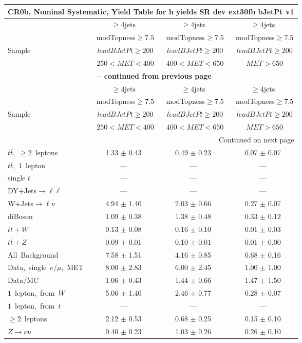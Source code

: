 \documentclass{article}
\begin{document}
\begin{longtable}{|l|c|c|c|} 
 
\multicolumn{4}{c}{ CR0b, Nominal Systematic, Yield Table for h yields SR dev ext30fb bJetPt v1 }\\* \hline 
  & $\ge4$jets  & $\ge4$jets  & $\ge4$jets \\* 
  & ~modTopness$\ge7.5$  & ~modTopness$\ge7.5$  & ~modTopness$\ge7.5$ \\* 
Sample  & ~$leadBJetPt\ge200$  & ~$leadBJetPt\ge200$  & ~$leadBJetPt\ge200$ \\* 
  & ~$250<MET<400$  & ~$400<MET<650$  & ~$MET>650$ \\* 
\hline \hline 
\endfirsthead 
 
\multicolumn{4}{c}{{\bfseries \tablename\ \thetable{} -- continued from previous page}}\\* \hline 
  & $\ge4$jets  & $\ge4$jets  & $\ge4$jets \\* 
  & ~modTopness$\ge7.5$  & ~modTopness$\ge7.5$  & ~modTopness$\ge7.5$ \\* 
Sample  & ~$leadBJetPt\ge200$  & ~$leadBJetPt\ge200$  & ~$leadBJetPt\ge200$ \\* 
  & ~$250<MET<400$  & ~$400<MET<650$  & ~$MET>650$ \\* 
\hline \hline 
\endhead 
 
\multicolumn{4}{|r|}{{Continued on next page}}\\* \hline 
\endfoot 
 
 
\endlastfoot 
 
$t\bar{t}$,~$\ge2$~leptons & 1.33 $\pm$ 0.43  & 0.49 $\pm$ 0.23  & 0.07 $\pm$ 0.07 \\* 
$t\bar{t}$,~$1$~lepton & ---  & ---  & --- \\* 
single $t$  & ---  & ---  & --- \\* 
DY+Jets$\rightarrow\ell\ell$  & ---  & ---  & --- \\* 
W+Jets$\rightarrow\ell\nu$  & 4.94 $\pm$ 1.40  & 2.03 $\pm$ 0.66  & 0.27 $\pm$ 0.07 \\* 
diBoson  & 1.09 $\pm$ 0.38  & 1.38 $\pm$ 0.48  & 0.33 $\pm$ 0.12 \\* 
$t\bar{t}+W$  & 0.13 $\pm$ 0.08  & 0.16 $\pm$ 0.10  & 0.01 $\pm$ 0.03 \\* 
$t\bar{t}+Z$  & 0.09 $\pm$ 0.01  & 0.10 $\pm$ 0.01  & 0.01 $\pm$ 0.00 \\* 
\hline \hline 
All~Background  & 7.58 $\pm$ 1.51  & 4.16 $\pm$ 0.85  & 0.68 $\pm$ 0.16 \\* 
Data,~single~$e/\mu$,~MET  & 8.00 $\pm$ 2.83  & 6.00 $\pm$ 2.45  & 1.00 $\pm$ 1.00 \\* 
Data/MC  & 1.06 $\pm$ 0.43  & 1.44 $\pm$ 0.66  & 1.47 $\pm$ 1.50 \\* 
\hline \hline 
$1$~lepton,~from~$W$  & 5.06 $\pm$ 1.40  & 2.46 $\pm$ 0.77  & 0.28 $\pm$ 0.07 \\* 
$1$~lepton,~from~$t$  & ---  & ---  & --- \\* 
$\ge2$~leptons  & 2.12 $\pm$ 0.53  & 0.68 $\pm$ 0.25  & 0.15 $\pm$ 0.10 \\* 
$Z\rightarrow\nu\nu$  & 0.40 $\pm$ 0.23  & 1.03 $\pm$ 0.26  & 0.26 $\pm$ 0.10 \\* 
\hline 
\end{longtable} 
\end{document}
